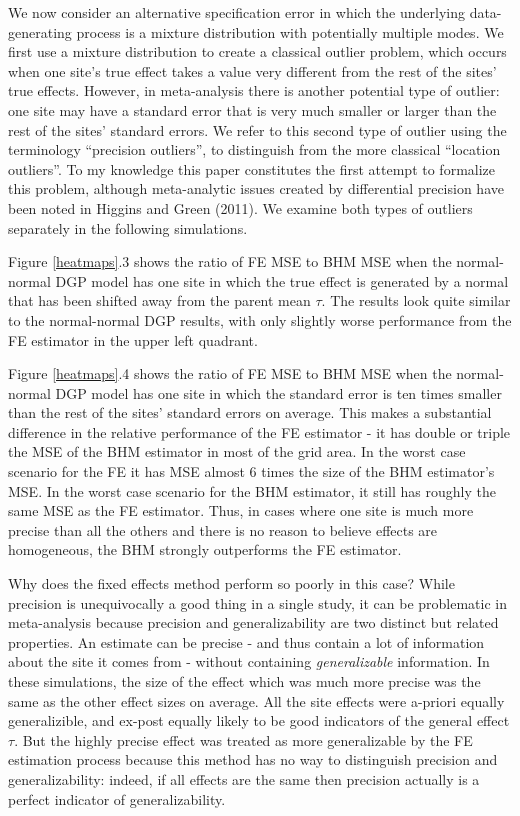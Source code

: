 \documentclass[12pt]{article}
\begin{document}
We now consider an alternative specification error in which the underlying data-generating process is a mixture distribution with potentially multiple modes. We first use a mixture distribution to create a classical outlier problem, which occurs when one site's true effect takes a value very different from the rest of the sites' true effects. However, in meta-analysis there is another potential type of outlier: one site may have a standard error that is very much smaller or larger than the rest of the sites' standard errors. We refer to this second type of outlier using the terminology ``precision outliers'', to distinguish from the more classical ``location outliers''. To my knowledge this paper constitutes the first attempt to formalize this problem, although meta-analytic issues created by differential precision have been noted in Higgins and Green (2011). We examine both types of outliers separately in the following simulations. 

Figure \ref{heatmaps}.3 shows the ratio of FE MSE to BHM MSE when the normal-normal DGP model has one site in which the true effect is generated by a normal that has been shifted away from the parent mean $\tau$. The results look quite similar to the normal-normal DGP results, with only slightly worse performance from the FE estimator in the upper left quadrant.

Figure \ref{heatmaps}.4 shows the ratio of FE MSE to BHM MSE when the normal-normal DGP model has one site in which the standard error is ten times smaller than the rest of the sites' standard errors on average. This makes a substantial difference in the relative performance of the FE estimator - it has double or triple the MSE of the BHM estimator in most of the grid area. In the worst case scenario for the FE it has MSE almost 6 times the size of the BHM estimator's MSE. In the worst case scenario for the BHM estimator, it still has roughly the same MSE as the FE estimator. Thus, in cases where one site is much more precise than all the others and there is no reason to believe effects are homogeneous, the BHM strongly outperforms the FE estimator.

Why does the fixed effects method perform so poorly in this case? While precision is unequivocally a good thing in a single study, it can be problematic in meta-analysis because precision and generalizability are two distinct but related properties. An estimate can be precise - and thus contain a lot of information about the site it comes from - without containing \emph{generalizable} information. In these simulations, the size of the effect which was much more precise was the same as the other effect sizes on average. All the site effects were a-priori equally generalizible, and ex-post equally likely to be good indicators of the general effect $\tau$. But the highly precise effect was treated as more generalizable by the FE estimation process because this method has no way to distinguish precision and generalizability: indeed, if all effects are the same then precision actually is a perfect indicator of generalizability. 
\end{document}
